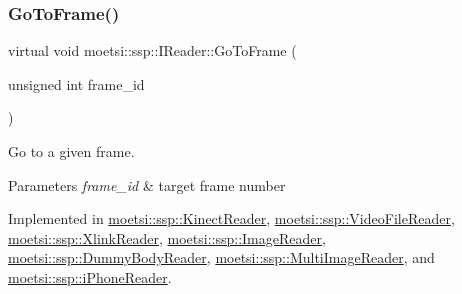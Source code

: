 \mbox{\label{classmoetsi_1_1ssp_1_1IReader_a6f1be3c06538992cca6d550bd9566681}} 
\subsubsection{\texorpdfstring{Go\+To\+Frame()}{GoToFrame()}\hspace{0.1cm}{\footnotesize\ttfamily [2/2]}}
{\footnotesize\ttfamily virtual void moetsi\+::ssp\+::\+I\+Reader\+::\+Go\+To\+Frame (\begin{DoxyParamCaption}\item[{unsigned int}]{frame\+\_\+id }\end{DoxyParamCaption})\hspace{0.3cm}{\ttfamily [pure virtual]}}



Go to a given frame. 


\begin{DoxyParams}{Parameters}
{\em frame\+\_\+id} & target frame number \\
\hline
\end{DoxyParams}


Implemented in \hyperlink{classmoetsi_1_1ssp_1_1KinectReader_a315690c46e153a35d4ded1189e93af08}{moetsi\+::ssp\+::\+Kinect\+Reader}, \hyperlink{classmoetsi_1_1ssp_1_1VideoFileReader_ad98a532db8b1e2c3879df274b2efb082}{moetsi\+::ssp\+::\+Video\+File\+Reader}, \hyperlink{classmoetsi_1_1ssp_1_1XlinkReader_af540d074aeb4d3075db45c246fd48627}{moetsi\+::ssp\+::\+Xlink\+Reader}, \hyperlink{classmoetsi_1_1ssp_1_1ImageReader_a32eb88cc612e6920f4910e0803b0ce3c}{moetsi\+::ssp\+::\+Image\+Reader}, \hyperlink{classmoetsi_1_1ssp_1_1DummyBodyReader_a61e495deb7314560d5e17388f6b6938f}{moetsi\+::ssp\+::\+Dummy\+Body\+Reader}, \hyperlink{classmoetsi_1_1ssp_1_1MultiImageReader_a7c552a1ad469660ea0a88b9ca85138ad}{moetsi\+::ssp\+::\+Multi\+Image\+Reader}, and \hyperlink{classmoetsi_1_1ssp_1_1iPhoneReader_a27b6dea97e4c4db8e4e749cc9e30e7ca}{moetsi\+::ssp\+::i\+Phone\+Reader}.

\mbox{\label{classmoetsi_1_1ssp_1_1IReader_af9186ba41e136dc4ec3242b5dd55fa04}} 
